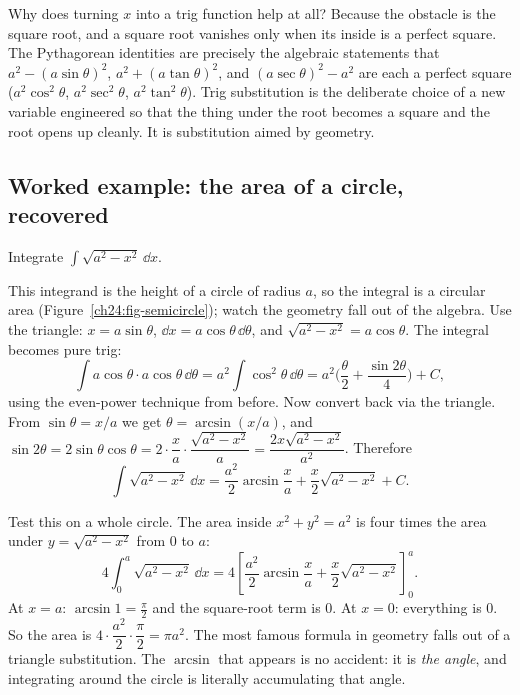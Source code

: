 \begin{whybox}
Why does turning $x$ into a trig function help at all? Because the obstacle is
the square root, and a square root vanishes only when its inside is a perfect
square. The Pythagorean identities are precisely the algebraic statements that
$a^2 - (a\sin\theta)^2$, $a^2 + (a\tan\theta)^2$, and $(a\sec\theta)^2 - a^2$
are each a perfect square ($a^2\cos^2\theta$, $a^2\sec^2\theta$,
$a^2\tan^2\theta$). Trig substitution is the deliberate choice of a new
variable engineered so that the thing under the root becomes a square and the
root opens up cleanly. It is substitution aimed by geometry.
\end{whybox}

\subsection{Worked example: the area of a circle, recovered}

\begin{example}[Root of $a^2 - x^2$]
\label{ch24:ex-circle}
Integrate $\displaystyle \int \sqrt{a^2 - x^2}\,\dd x.$
\end{example}

This integrand is the height of a circle of radius $a$, so the integral is a
circular area (Figure~\ref{ch24:fig-semicircle}); watch the geometry fall out
of the algebra. Use the triangle: $x = a\sin\theta$, $\dd x =
a\cos\theta\,\dd\theta$, and $\sqrt{a^2-x^2} = a\cos\theta$. The integral
becomes pure trig:
\[
\int a\cos\theta\cdot a\cos\theta\,\dd\theta
= a^2\int \cos^2\theta\,\dd\theta
= a^2\Big(\frac{\theta}{2} + \frac{\sin 2\theta}{4}\Big) + C,
\]
using the even-power technique from before. Now convert back via the triangle.
From $\sin\theta = x/a$ we get $\theta = \arcsin(x/a)$, and $\sin 2\theta =
2\sin\theta\cos\theta = 2\cdot\dfrac{x}{a}\cdot\dfrac{\sqrt{a^2-x^2}}{a} =
\dfrac{2x\sqrt{a^2-x^2}}{a^2}$. Therefore
\[
\int \sqrt{a^2-x^2}\,\dd x
= \frac{a^2}{2}\arcsin\!\frac{x}{a} + \frac{x}{2}\sqrt{a^2 - x^2} + C.
\]

\begin{aestheticbox}
Test this on a whole circle. The area inside $x^2 + y^2 = a^2$ is four times
the area under $y = \sqrt{a^2 - x^2}$ from $0$ to $a$:
\[
4\int_0^a \sqrt{a^2 - x^2}\,\dd x
= 4\left[\frac{a^2}{2}\arcsin\!\frac{x}{a} + \frac{x}{2}\sqrt{a^2-x^2}
\right]_0^a.
\]
At $x = a$: $\arcsin 1 = \tfrac{\pi}{2}$ and the square-root term is $0$. At
$x = 0$: everything is $0$. So the area is $4\cdot\dfrac{a^2}{2}\cdot
\dfrac{\pi}{2} = \pi a^2$. The most famous formula in geometry falls out of a
triangle substitution. The $\arcsin$ that appears is no accident: it is
\emph{the angle}, and integrating around the circle is literally accumulating
that angle.
\end{aestheticbox}

